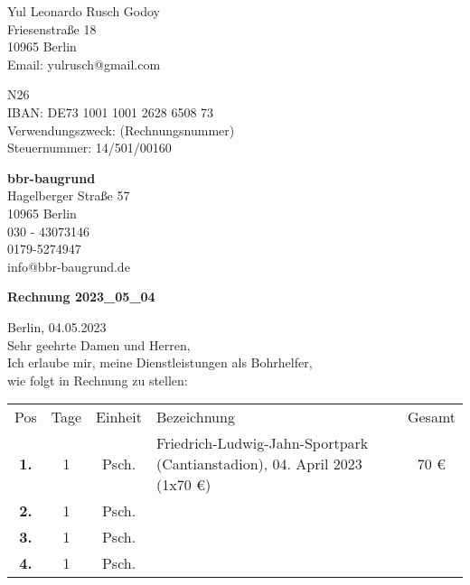 \documentclass[12pt]{article}
\begin{document}

\begin{flushright}

Yul Leonardo Rusch Godoy\\
Friesenstraße 18\\
10965 Berlin\\
Email: yulrusch@gmail.com\\

\vspace{0.5cm}

N26\\
IBAN: DE73 1001 1001 2628 6508 73\\
Verwendungszweck: (Rechnungsnummer)\\
Steuernummer: 14/501/00160\\

\end{flushright}

\vspace{0.5cm}

\begin{flushleft}

\textbf{bbr-baugrund}\\
Hagelberger Straße 57\\
10965 Berlin\\
030 - 43073146\\
0179-5274947\\
info@bbr-baugrund.de\\

\vspace{2cm}

\textbf{Rechnung 2023\_05\_04\\}

\vspace{0.5cm}

Berlin, 04.05.2023\\
Sehr geehrte Damen und Herren,\\
Ich erlaube mir, meine Dienstleistungen als Bohrhelfer,\\
wie folgt in Rechnung zu stellen:\\

\end{flushleft}

\begin{flushleft}
\begin{tabular}{c c c p{9.7cm} c}
Pos & Tage & Einheit & Bezeichnung & Gesamt\\ 
\rowcolor{lightgrey}
\textbf{1.} & 1 & Psch. & Friedrich-Ludwig-Jahn-Sportpark (Cantianstadion), 04. April 2023 (1x70 €) & 70 €\\ 
\textbf{2.} & 1 & Psch. &  & \\ 
\rowcolor{lightgrey}
\textbf{3.} & 1 & Psch. &  & \\ 
\textbf{4.} & 1 & Psch. &  & \\ 
\end{tabular}        
\end{flushleft}
\end{document}
